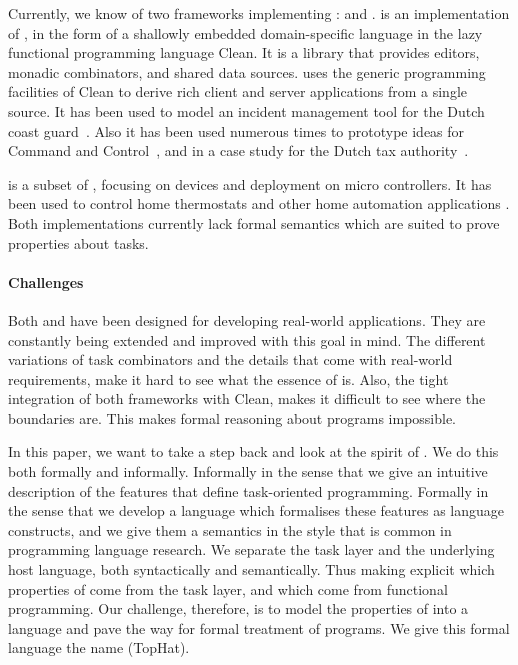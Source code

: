 Currently, we know of two frameworks implementing \TOP: \ITASKS and \MTASKS.
%
\ITASKS is an implementation of \TOP, in the form of a shallowly embedded domain-specific language in the lazy functional programming language Clean.
It is a library that provides editors, monadic combinators, and shared data sources.
\ITASKS uses the generic programming facilities of Clean to derive rich client and server applications from a single source.
It has been used to model an incident management tool for the Dutch coast guard~\cite{conf/iscram/LijnseJP12}.
Also it has been used numerous times to prototype ideas for Command and Control~\cite{theses/nlda/Kool17, theses/radboud/Stutterheim17}, and in a case study for the Dutch tax authority~\cite{conf/sfp/StutterheimAP17}.

\MTASKS is a subset of \ITASKS,
focusing on \IOT devices and deployment on micro controllers.
It has been used to control home thermostats and other home automation applications \cite{koopman2018task}.
%
Both implementations currently lack formal semantics which are suited to prove properties about tasks.



\paragraph{Challenges}

Both \ITASKS and \MTASKS have been designed for developing real-world applications.
They are constantly being extended and improved with this goal in mind.
The different variations of task combinators and the details that come with real-world requirements,
make it hard to see what the essence of \TOP is.
Also, the tight integration of both frameworks with Clean, makes it difficult to see where the boundaries are.
This makes formal reasoning about \TOP programs impossible.

In this paper, we want to take a step back and look at the spirit of \TOP.
We do this both formally and informally.
Informally in the sense that we give an intuitive description of the features that define task-oriented programming.
Formally in the sense that we develop a language which formalises these features as language constructs,
and we give them a semantics in the style that is common in programming language research.
We separate the task layer and the underlying host language, both syntactically and semantically.
Thus making explicit which properties of \TOP come from the task layer, and which come from functional programming.
Our challenge, therefore, is to model the properties of \TOP into a language
and pave the way for formal treatment of \TOP programs.
We give this formal language the name \TOPHAT (TopHat).



